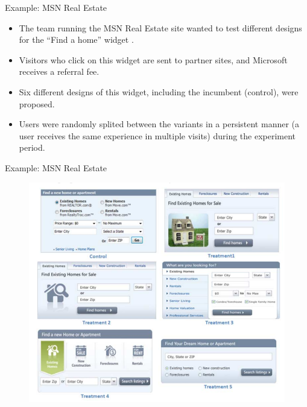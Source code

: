 \documentclass[handout]{beamer}
\begin{document}
\begin{frame}{Example: MSN Real Estate}
\scriptsize{


\begin{itemize}

\item The team running the MSN Real Estate site wanted to test different designs for the ``Find a home'' widget \cite{kohavi2009online}.

\item Visitors who click on this widget are sent to partner sites, and Microsoft receives a referral fee. 

\item Six different designs of this widget, including the incumbent (control), were proposed.

\item Users were randomly splited between the variants in a persistent manner (a user receives the same experience in multiple visits) during the experiment period.

\end{itemize}



} 
\end{frame}


\begin{frame}{Example: MSN Real Estate}


\begin{figure}[h!]
	\centering
	\includegraphics[scale=0.43]{pics/widgets.png}
\end{figure}




\end{frame}
\end{document}
